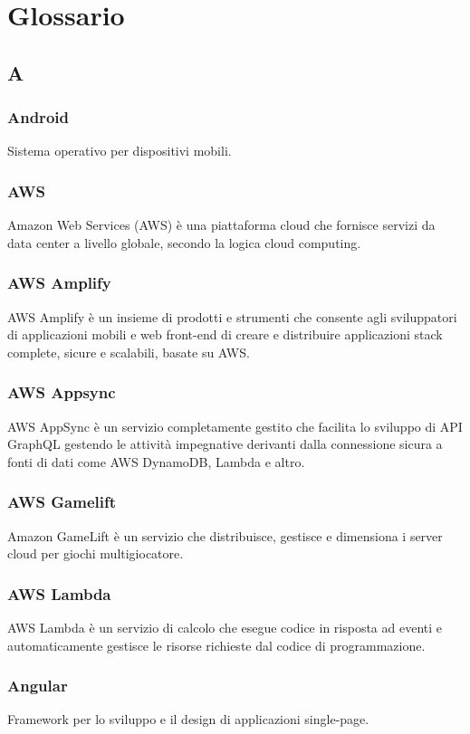 \section{Glossario}


\subsection*{A}
\subsubsection*{Android} Sistema operativo per dispositivi mobili.
\subsubsection*{AWS} Amazon Web Services (AWS) è una piattaforma cloud che fornisce servizi da data center a livello globale, secondo la logica cloud computing.
\subsubsection*{AWS Amplify} AWS Amplify è un insieme di prodotti e strumenti che consente agli sviluppatori di applicazioni mobili e web front-end di creare e distribuire applicazioni stack complete, sicure e scalabili, basate su AWS.
\subsubsection*{AWS Appsync} AWS AppSync è un servizio completamente gestito che facilita lo sviluppo di API GraphQL gestendo le attività impegnative derivanti dalla connessione sicura a fonti di dati come AWS DynamoDB, Lambda e altro.
\subsubsection*{AWS Gamelift} Amazon GameLift è un servizio che distribuisce, gestisce e dimensiona i server cloud per giochi multigiocatore.
\subsubsection*{AWS Lambda} AWS Lambda è un servizio di calcolo che esegue codice in risposta ad eventi e automaticamente gestisce le risorse richieste dal codice di programmazione.
\subsubsection*{Angular} Framework per lo sviluppo e il design di applicazioni single-page.
